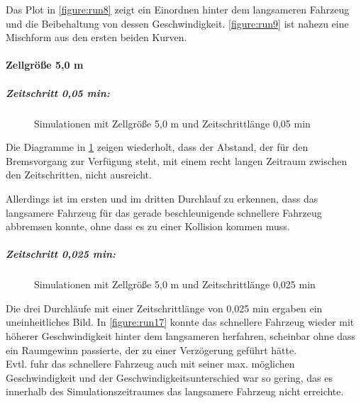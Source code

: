 Das Plot in \cref{figure:run8} zeigt ein Einordnen hinter dem langsameren Fahrzeug und die Beibehaltung von dessen Geschwindigkeit.
\cref{figure:run9} ist nahezu eine Mischform aus den ersten beiden Kurven.


\paragraph*{Zellgröße 5,0 m}
\hfill 
\subparagraph*{Zeitschritt 0,05 min:}
\begin{figure}[hptb]
  \centering 
   \qquad 
   \qquad 
  \caption{Simulationen mit Zellgröße 5,0 m und Zeitschrittlänge 0,05 min} 
  \label{figure:run14-16}
\end{figure}

Die Diagramme in \cref{figure:run14-16} zeigen wiederholt, dass der Abstand, der für den Bremsvorgang zur Verfügung steht, mit einem recht langen Zeitraum zwischen den Zeitschritten, nicht ausreicht.

Allerdings ist im ersten und im dritten Durchlauf zu erkennen, dass das langsamere Fahrzeug für das gerade beschleunigende schnellere Fahrzeug abbremsen konnte, ohne dass es zu einer Kollision kommen muss. 

\subparagraph*{Zeitschritt 0,025 min:}
\begin{figure}[hptb]
  \centering 
   \qquad 
   \qquad 
  \caption{Simulationen mit Zellgröße 5,0 m und Zeitschrittlänge 0,025 min} 
  \label{figure:run17-19}
\end{figure}

Die drei Durchläufe mit einer Zeitschrittlänge von 0,025 min ergaben ein uneinheitliches Bild.
In \cref{figure:run17} konnte das schnellere Fahrzeug wieder mit höherer Geschwindigkeit hinter dem langsameren herfahren, scheinbar ohne dass ein Raumgewinn passierte, der zu einer Verzögerung geführt hätte.
\\
Evtl. fuhr das schnellere Fahrzeug auch mit seiner max. möglichen Geschwindigkeit und der Geschwindigkeitsunterschied war so gering, das es innerhalb des Simulationszeitraumes das langsamere Fahrzeug nicht erreichte.

